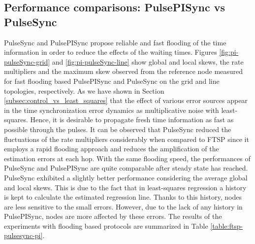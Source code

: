 \documentclass[english,a4paper,10pt,final]{article}
\numberwithin{equation}{section}
\numberwithin{figure}{section}
\begin{document}
\begin{figure*}

\center





\caption{\label{fig:pi-pulseSync-line} Global skew, local skew, rate multipliers and maximum skew to the reference node on the {\bf line topology} for \textbf{PulsePISync} (left column) and \textbf{PulseSync} (right column), respectively.}
\end{figure*}




\subsection{Performance comparisons: PulsePISync vs PulseSync}

PulseSync and PulsePISync propose reliable and fast flooding of the time information in order to reduce the effects of the waiting times. Figures \ref{fig:pi-pulseSync-grid} and \ref{fig:pi-pulseSync-line} show global and local skews, the rate multipliers and the maximum skew observed from the reference node measured for fast flooding based PulsePISync and PulseSync on the  grid and line topologies, respectively. As we have shown in Section \ref{subsec:control_vs_least_squares} that the effect of various error sources appear in the time synchronization error dynamics as multiplicative noise with least-squares. Hence, it is desirable to propagate fresh time information as fast as possible through the pulses.  It can be observed that PulseSync reduced the fluctuations of the rate multipliers considerably when compared to FTSP since it employs a rapid flooding approach and reduces the amplification of the estimation errors at each hop.  With the same flooding speed, the performances of PulseSync and PulsePISync are quite comparable after steady state has reached. PulseSync exhibited a slightly better performance considering the average global and local skews. This is due to the fact that in least-squares regression a history is kept to calculate the estimated regression line. Thanks to this history, nodes are less sensitive to the small errors. However, due to the lack of any history in PulsePISync, nodes are more affected by these errors. The results of the experiments with flooding based protocols are summarized in Table \ref{table:ftsp-pulsesync-pi}.
\end{document}

